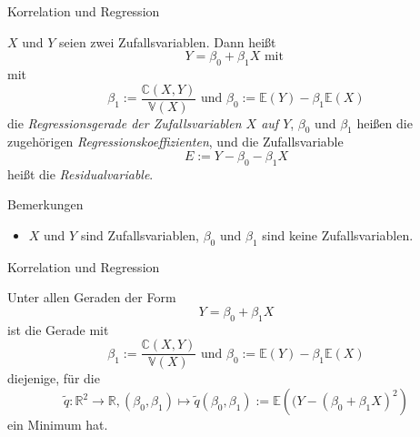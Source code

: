 \documentclass[
  8pt,
  ignorenonframetext,
]{beamer}
\providecommand{\tightlist}{%
  \setlength{\itemsep}{0pt}\setlength{\parskip}{0pt}}
\begin{document}
\begin{frame}{Korrelation und Regression}
\protect\hypertarget{korrelation-und-regression-2}{}
\small
\begin{definition}
\justifying
$X$ und $Y$ seien zwei Zufallsvariablen. Dann heißt
\begin{equation}
Y  = \beta_0 + \beta_1 X \mbox{ mit }
\end{equation}
mit
\begin{equation}
\beta_1 := \frac{\mathbb{C}(X,Y)}{\mathbb{V}(X)} \mbox{ und }\beta_0 := \mathbb{E}(Y) - \beta_1\mathbb{E}(X)
\end{equation}
die \textit{Regressionsgerade der Zufallsvariablen $X$ auf $Y$}, $\beta_0$ und
$\beta_1$ heißen die zugehörigen \textit{Regressionskoeffizienten}, und die
Zufallsvariable
\begin{equation}
E := Y - \beta_0 - \beta_1 X
\end{equation}
heißt die \textit{Residualvariable}.
\end{definition}

\footnotesize

Bemerkungen

\begin{itemize}
\tightlist
\item
  \(X\) und \(Y\) sind Zufallsvariablen, \(\beta_0\) und \(\beta_1\)
  sind keine Zufallsvariablen.
\end{itemize}
\end{frame}

\begin{frame}{Korrelation und Regression}
\protect\hypertarget{korrelation-und-regression-3}{}
\small
\begin{theorem}
\justifying
\normalfont
Unter allen Geraden der Form
\begin{equation}
Y  = \beta_0 + \beta_1 X
\end{equation}
ist die Gerade mit
\begin{equation}
\beta_1 := \frac{\mathbb{C}(X,Y)}{\mathbb{V}(X)} \mbox{ und } \beta_0 :=  \mathbb{E}(Y) - \beta_1\mathbb{E}(X)
\end{equation}
diejenige, für die
\begin{equation}
\tilde{q}: \mathbb{R}^2 \to \mathbb{R}, (\beta_0, \beta_1) \mapsto \tilde{q}(\beta_0,\beta_1) := \mathbb{E}\left((Y - (\beta_0 + \beta_1 X)^2\right)
\end{equation}
ein Minimum hat.
\end{theorem}
\end{frame}
\end{document}
